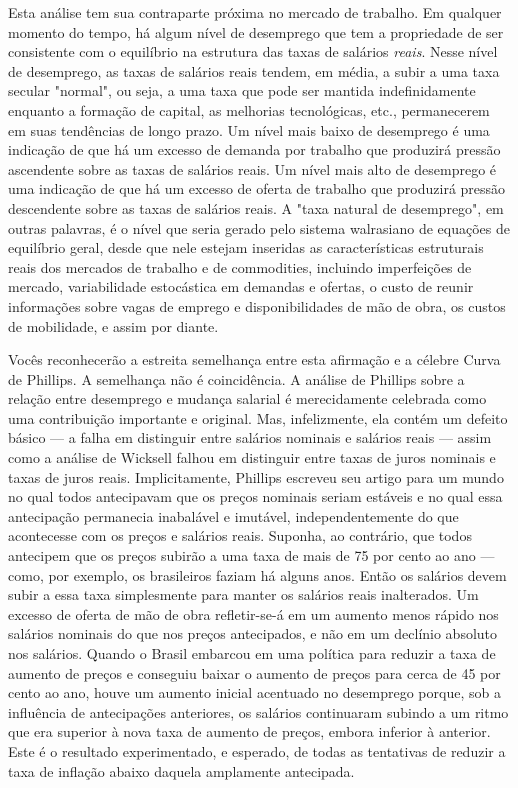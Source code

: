 \documentclass[12pt]{article}
\begin{document}
Esta análise tem sua contraparte próxima no mercado de trabalho. Em qualquer momento do tempo, há algum nível de desemprego que tem a propriedade de ser consistente com o equilíbrio na estrutura das taxas de salários \textit{reais}. Nesse nível de desemprego, as taxas de salários reais tendem, em média, a subir a uma taxa secular "normal", ou seja, a uma taxa que pode ser mantida indefinidamente enquanto a formação de capital, as melhorias tecnológicas, etc., permanecerem em suas tendências de longo prazo. Um nível mais baixo de desemprego é uma indicação de que há um excesso de demanda por trabalho que produzirá pressão ascendente sobre as taxas de salários reais. Um nível mais alto de desemprego é uma indicação de que há um excesso de oferta de trabalho que produzirá pressão descendente sobre as taxas de salários reais. A "taxa natural de desemprego", em outras palavras, é o nível que seria gerado pelo sistema walrasiano de equações de equilíbrio geral, desde que nele estejam inseridas as características estruturais reais dos mercados de trabalho e de commodities, incluindo imperfeições de mercado, variabilidade estocástica em demandas e ofertas, o custo de reunir informações sobre vagas de emprego e disponibilidades de mão de obra, os custos de mobilidade, e assim por diante.

Vocês reconhecerão a estreita semelhança entre esta afirmação e a célebre Curva de Phillips. A semelhança não é coincidência. A análise de Phillips sobre a relação entre desemprego e mudança salarial é merecidamente celebrada como uma contribuição importante e original. Mas, infelizmente, ela contém um defeito básico — a falha em distinguir entre salários nominais e salários reais — assim como a análise de Wicksell falhou em distinguir entre taxas de juros nominais e taxas de juros reais. Implicitamente, Phillips escreveu seu artigo para um mundo no qual todos antecipavam que os preços nominais seriam estáveis e no qual essa antecipação permanecia inabalável e imutável, independentemente do que acontecesse com os preços e salários reais. Suponha, ao contrário, que todos antecipem que os preços subirão a uma taxa de mais de 75 por cento ao ano — como, por exemplo, os brasileiros faziam há alguns anos. Então os salários devem subir a essa taxa simplesmente para manter os salários reais inalterados. Um excesso de oferta de mão de obra refletir-se-á em um aumento menos rápido nos salários nominais do que nos preços antecipados, e não em um declínio absoluto nos salários. Quando o Brasil embarcou em uma política para reduzir a taxa de aumento de preços e conseguiu baixar o aumento de preços para cerca de 45 por cento ao ano, houve um aumento inicial acentuado no desemprego porque, sob a influência de antecipações anteriores, os salários continuaram subindo a um ritmo que era superior à nova taxa de aumento de preços, embora inferior à anterior. Este é o resultado experimentado, e esperado, de todas as tentativas de reduzir a taxa de inflação abaixo daquela amplamente antecipada.
\end{document}
